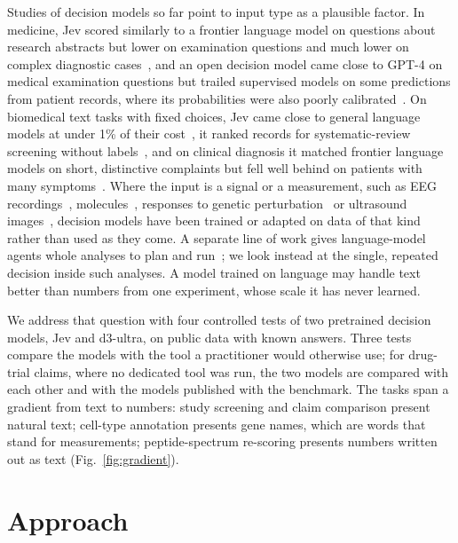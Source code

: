 \documentclass[10pt,twocolumn]{article}
\begin{document}
Studies of decision models so far point to input type as a plausible factor. In medicine, Jev scored similarly to a frontier language model on questions about research abstracts but lower on examination questions and much lower on complex diagnostic cases~\cite{madrid2026}, and an open decision model came close to GPT-4 on medical examination questions but trailed supervised models on some predictions from patient records, where its probabilities were also poorly calibrated~\cite{medjev}. On biomedical text tasks with fixed choices, Jev came close to general language models at under 1\% of their cost~\cite{chen2026}, it ranked records for systematic-review screening without labels~\cite{jo2026}, and on clinical diagnosis it matched frontier language models on short, distinctive complaints but fell well behind on patients with many symptoms~\cite{deobhakta2026}. Where the input is a signal or a measurement, such as EEG recordings~\cite{eegjev}, molecules~\cite{molrejev}, responses to genetic perturbation~\cite{s1pert} or ultrasound images~\cite{kevbio}, decision models have been trained or adapted on data of that kind rather than used as they come. A separate line of work gives language-model agents whole analyses to plan and run~\cite{drugcoding,omicsbench}; we look instead at the single, repeated decision inside such analyses. A model trained on language may handle text better than numbers from one experiment, whose scale it has never learned.

We address that question with four controlled tests of two pretrained decision models, Jev and d3-ultra, on public data with known answers. Three tests compare the models with the tool a practitioner would otherwise use; for drug-trial claims, where no dedicated tool was run, the two models are compared with each other and with the models published with the benchmark. The tasks span a gradient from text to numbers: study screening and claim comparison present natural text; cell-type annotation presents gene names, which are words that stand for measurements; peptide-spectrum re-scoring presents numbers written out as text (Fig.~\ref{fig:gradient}).


\section{Approach}
\end{document}
